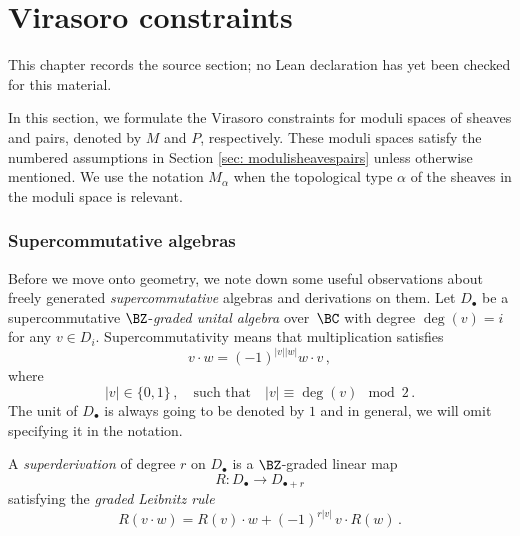 \chapter{Virasoro constraints}
\label{virasoro-constraints-moduli-sheaves-vertex-algebras-chapter-02}

\begin{remark}
\label{virasoro-constraints-moduli-sheaves-vertex-algebras-chapter-02-source}
This chapter records the source section; no Lean declaration has yet been checked for this material.
\notready
\end{remark}

\label{sec: virasoro constraints}

In this section, we formulate the Virasoro constraints for moduli spaces of sheaves and pairs, denoted by $M$ and $P$, respectively. These moduli spaces satisfy the numbered assumptions in Section \ref{sec: modulisheavespairs} unless otherwise mentioned. We use the notation $M_\alpha$ when the topological type $\alpha$ of the sheaves in the moduli space is relevant.

\subsection{Supercommutative algebras}
\label{sec: supercommutative}
Before we move onto geometry, we note down some useful observations about freely generated \textit{supercommutative} algebras and derivations on them. Let $D_\bullet$ be a supercommutative $\BZ$-\textit{graded unital algebra} over~$\BC$ with degree $\deg(v) = i$ for any $v\in D_i$. Supercommutativity means that multiplication satisfies
\[v\cdot w = (-1)^{|v||w|} w\cdot v\,,\]
where
$$|v|\in \{0,1\}\,,\quad  \text{such that} \quad |v|\equiv \deg(v)\mod 2\,.$$
The unit of $D_\bullet$ is always going to be denoted by $1$ and in general, we will omit specifying it in the notation.

A \textit{superderivation} of degree $r$ on $D_\bullet$ is a $\BZ$-graded linear map
$$
R:D_\bullet\longrightarrow D_{\bullet+r}
$$
satisfying the \textit{graded Leibnitz rule}
$$R(v\cdot w) = R(v)\cdot w + (-1)^{r|v|}\,v\cdot R(w)\,.$$


